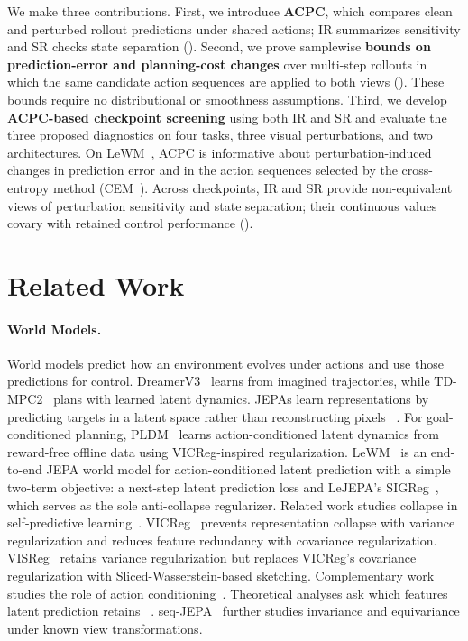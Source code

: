 \documentclass{article}
\begin{document}
We make three contributions. First, we introduce \textbf{ACPC}, which compares
clean and perturbed rollout predictions under shared actions; IR summarizes
sensitivity and SR checks state separation (). Second, we
prove samplewise \textbf{bounds on prediction-error and planning-cost changes}
over multi-step rollouts in which the same candidate action sequences are applied to both views
(). These bounds
require no distributional or smoothness assumptions. Third, we develop
\textbf{ACPC-based checkpoint screening} using both IR and SR and evaluate the three proposed diagnostics on four tasks, three visual perturbations, and two architectures.
On LeWM~\citep{maes2026lewm}, ACPC is informative about perturbation-induced changes in prediction error and in the action sequences selected by the cross-entropy method (CEM~\citep{kroese2006cem}). Across
checkpoints, IR and SR provide non-equivalent views of perturbation sensitivity
and state separation; their continuous values covary with retained
control performance ().

\section{Related Work}\label{sec:related}

\paragraph{World Models.}
World models predict how an environment evolves under actions and use those
predictions for control. DreamerV3~\citep{hafner2025dreamerv3} learns from
imagined trajectories, while TD-MPC2~\citep{hansen2024tdmpc2} plans with
learned latent dynamics. JEPAs
learn representations by predicting targets in a latent space rather
than reconstructing pixels
~\citep{lecun2022path,assran2023ijepa,bardes2024vjepa,assran2025vjepa2}.
For goal-conditioned planning, PLDM~\citep{sobal2025stresstesting} learns
action-conditioned latent dynamics from reward-free offline data using
VICReg-inspired regularization.
LeWM~\citep{maes2026lewm} is an end-to-end JEPA world model for
action-conditioned latent prediction with a simple two-term objective: a
next-step latent prediction loss and LeJEPA's SIGReg~\citep{balestriero2025lejepa}, which serves as the sole anti-collapse regularizer.
Related work studies collapse in self-predictive
learning~\citep{tang2023selfpredictive}.
VICReg~\citep{bardes2022vicreg} prevents representation collapse with variance regularization
and reduces feature redundancy with covariance regularization.
VISReg~\citep{wu2026visreg} retains variance regularization but
replaces VICReg's covariance regularization with Sliced-Wasserstein-based
sketching.
Complementary work studies the role of action
conditioning~\citep{khetarpal2025actionconditional}.
Theoretical analyses ask which features latent prediction retains
~\citep{vanassel2025jointembeddingreconstruction,littwin2024jepaavoidsnoisyfeatures}.
seq-JEPA~\citep{ghaemi2025seqjepa} further studies invariance and equivariance
under known view transformations.
\end{document}
